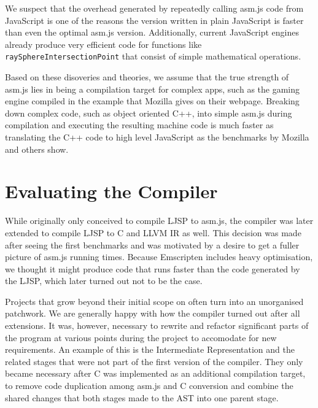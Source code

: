 \documentclass[11pt]{report}
\begin{document}
We suspect that the overhead generated by repeatedly calling asm.js code from JavaScript is one of the reasons the version written in plain JavaScript is faster than even the optimal asm.js version. Additionally, current JavaScript engines already produce very efficient code for functions like \texttt{raySphereIntersectionPoint} that consist of simple mathematical operations.

Based on these disoveries and theories, we assume that the true strength of asm.js lies in being a compilation target for complex apps, such as the gaming engine compiled in the example that Mozilla gives on their webpage. Breaking down complex code, such as object oriented C++, into simple asm.js during compilation and executing the resulting machine code is much faster as translating the C++ code to high level JavaScript as the benchmarks by Mozilla and others show.

\section{Evaluating the Compiler}

While originally only conceived to compile LJSP to asm.js, the compiler was later extended to compile LJSP to C and LLVM IR as well. This decision was made after seeing the first benchmarks and was motivated by a desire to get a fuller picture of asm.js running times. Because Emscripten includes heavy optimisation, we thought it might produce code that runs faster than the code generated by the LJSP, which later turned out not to be the case.

Projects that grow beyond their initial scope on often turn into an unorganised patchwork. We are generally happy with how the compiler turned out after all extensions. It was, however, necessary to rewrite and refactor significant parts of the program at various points during the project to accomodate for new requirements. An example of this is the Intermediate Representation and the related stages that were not part of the first version of the compiler. They only became necessary after C was implemented as an additional compilation target, to remove code duplication among asm.js and C conversion and combine the shared changes that both stages made to the AST into one parent stage.
\end{document}
